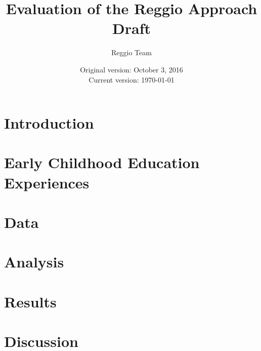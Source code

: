 






\title{\Large \textbf{Evaluation of the Reggio Approach} \\ Draft}
\author{\normalsize Reggio Team}
\date{\normalsize Original version: October 3, 2016 \\ Current version: \today}
\maketitle

\doublespacing

\section{Introduction}
\label{sec:introduction}


\section{Early Childhood Education Experiences}
\label{sec:eceexperiences}


\section{Data}
\label{sec:data}



\section{Analysis}
\label{sec:methodology}
%


\section{Results}
\label{sec:result}


\section{Discussion}
\label{sec:discussion}


\clearpage






